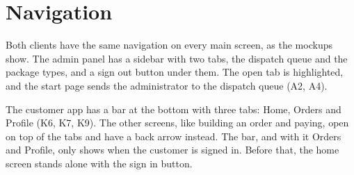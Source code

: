 \documentclass[a4paper,11pt]{article}
\begin{document}

\section{Navigation}
Both clients have the same navigation on every main screen, as the mockups show. The admin panel has a sidebar with two tabs, the dispatch queue and the package types, and a sign out button under them. The open tab is highlighted, and the start page sends the administrator to the dispatch queue (A2, A4).

The customer app has a bar at the bottom with three tabs: Home, Orders and Profile (K6, K7, K9). The other screens, like building an order and paying, open on top of the tabs and have a back arrow instead. The bar, and with it Orders and Profile, only shows when the customer is signed in. Before that, the home screen stands alone with the sign in button.
\end{document}
